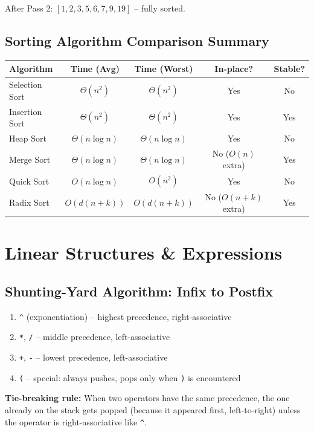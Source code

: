 \documentclass[12pt,portrait]{article}
\begin{document}
After Pass 2: $[1, 2, 3, 5, 6, 7, 9, 19]$ -- fully sorted.

\subsection{Sorting Algorithm Comparison Summary}

\begin{center}
{\small
\begin{tabular}{l|c|c|c|c}
\toprule
\textbf{Algorithm} & \textbf{Time (Avg)} & \textbf{Time (Worst)} & \textbf{In-place?} & \textbf{Stable?} \\
\midrule
Selection Sort & $\Theta(n^2)$ & $\Theta(n^2)$ & Yes & No \\
Insertion Sort & $\Theta(n^2)$ & $\Theta(n^2)$ & Yes & Yes \\
Heap Sort & $\Theta(n\log n)$ & $\Theta(n\log n)$ & Yes & No \\
Merge Sort & $\Theta(n\log n)$ & $\Theta(n\log n)$ & No ($O(n)$ extra) & Yes \\
Quick Sort & $O(n\log n)$ & $O(n^2)$ & Yes & No \\
Radix Sort & $O(d(n+k))$ & $O(d(n+k))$ & No ($O(n+k)$ extra) & Yes \\
\bottomrule
\end{tabular}
}
\end{center}

\section{Linear Structures \& Expressions}
\label{sec:linear}

\subsection{Shunting-Yard Algorithm: Infix to Postfix}
\label{sec:shunting}

\begin{rulebox}
\begin{enumerate}[leftmargin=*]
    \item \texttt{\^} (exponentiation) -- highest precedence, right-associative
    \item \texttt{*}, \texttt{/} -- middle precedence, left-associative
    \item \texttt{+}, \texttt{-} -- lowest precedence, left-associative
    \item \texttt{(} -- special: always pushes, pops only when \texttt{)} is encountered
\end{enumerate}
\textbf{Tie-breaking rule:} When two operators have the same precedence, the one already on the stack gets popped (because it appeared first, left-to-right) unless the operator is right-associative like \texttt{\^}.
\end{rulebox}
\end{document}
